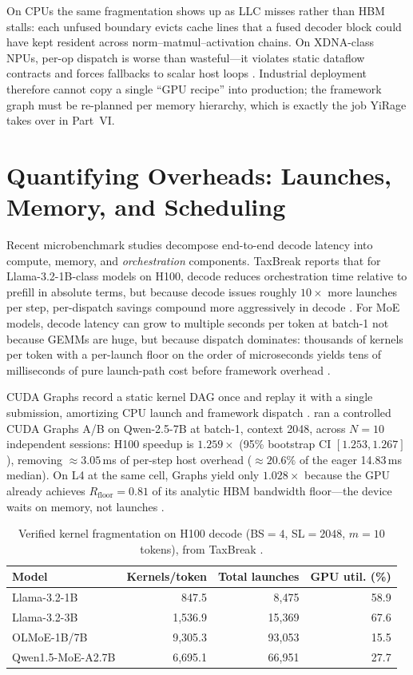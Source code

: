 On CPUs the same fragmentation shows up as LLC misses rather than HBM stalls: each unfused boundary evicts cache lines that a fused decoder block could have kept resident across norm--matmul--activation chains.
On XDNA-class NPUs, per-op dispatch is worse than wasteful---it violates static dataflow contracts and forces fallbacks to scalar host loops \citep{amd2024xdna}.
Industrial deployment therefore cannot copy a single ``GPU recipe'' into production; the framework graph must be re-planned per memory hierarchy, which is exactly the job YiRage takes over in Part~VI.

\section{Quantifying Overheads: Launches, Memory, and Scheduling}
\label{sec:overhead_quant}

Recent microbenchmark studies decompose end-to-end decode latency into compute, memory, and \emph{orchestration} components.
TaxBreak reports that for Llama-3.2-1B-class models on H100, decode reduces orchestration time relative to prefill in absolute terms, but because decode issues roughly $10\times$ more launches per step, per-dispatch savings compound more aggressively in decode \citep{taxbreak2026}.
For MoE models, decode latency can grow to multiple seconds per token at batch-1 not because GEMMs are huge, but because dispatch dominates: thousands of kernels per token with a per-launch floor on the order of microseconds yields tens of milliseconds of pure launch-path cost before framework overhead \citep{taxbreak2026}.

CUDA Graphs record a static kernel DAG once and replay it with a single submission, amortizing CPU launch and framework dispatch \citep{nvidia2024cudagraphs,memoryfloor2026}.
\citet{memoryfloor2026} ran a controlled CUDA Graphs A/B on Qwen-2.5-7B at batch-1, context 2048, across $N{=}10$ independent sessions: H100 speedup is $1.259\times$ (95\% bootstrap CI $[1.253,1.267]$), removing ${\approx}3.05$\,ms of per-step host overhead (${\approx}20.6\%$ of the eager 14.83\,ms median).
On L4 at the same cell, Graphs yield only $1.028\times$ because the GPU already achieves $R_{\mathrm{floor}}{=}0.81$ of its analytic HBM bandwidth floor---the device waits on memory, not launches \citep{memoryfloor2026}.

\begin{table}[t]
\centering
\caption{Verified kernel fragmentation on H100 decode (BS${=}4$, SL${=}2048$, $m{=}10$ tokens), from TaxBreak \citep{taxbreak2026}.}
\label{tab:taxbreak_kernels}
\begin{tabular}{lrrr}
\toprule
\textbf{Model} & \textbf{Kernels/token} & \textbf{Total launches} & \textbf{GPU util. (\%)} \\
\midrule
Llama-3.2-1B & 847.5 & 8,475 & 58.9 \\
Llama-3.2-3B & 1,536.9 & 15,369 & 67.6 \\
OLMoE-1B/7B & 9,305.3 & 93,053 & 15.5 \\
Qwen1.5-MoE-A2.7B & 6,695.1 & 66,951 & 27.7 \\
\bottomrule
\end{tabular}
\end{table}

